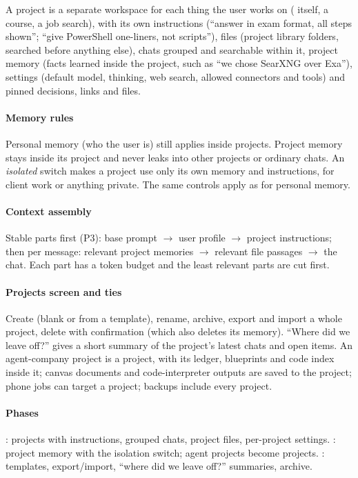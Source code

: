 A project is a separate workspace for each thing the user works on (\hivi{} itself, a course, a job search), with its own instructions (``answer in exam format, all steps shown''; ``give PowerShell one-liners, not scripts''), files (project library folders, searched before anything else), chats grouped and searchable within it, project memory (facts learned inside the project, such as ``we chose SearXNG over Exa''), settings (default model, thinking, web search, allowed connectors and tools) and pinned decisions, links and files.

\paragraph{Memory rules} Personal memory (who the user is) still applies inside projects. Project memory stays inside its project and never leaks into other projects or ordinary chats. An \emph{isolated} switch makes a project use only its own memory and instructions, for client work or anything private. The same controls apply as for personal memory.

\paragraph{Context assembly} Stable parts first (P3): base prompt $\rightarrow$ user profile $\rightarrow$ project instructions; then per message: relevant project memories $\rightarrow$ relevant file passages $\rightarrow$ the chat. Each part has a token budget and the least relevant parts are cut first.

\paragraph{Projects screen and ties} Create (blank or from a template), rename, archive, export and import a whole project, delete with confirmation (which also deletes its memory). ``Where did we leave off?'' gives a short summary of the project's latest chats and open items. An agent-company project is a \hivi{} project, with its ledger, blueprints and code index inside it; canvas documents and code-interpreter outputs are saved to the project; phone jobs can target a project; backups include every project.

\paragraph{Phases} : projects with instructions, grouped chats, project files, per-project settings. : project memory with the isolation switch; agent projects become \hivi{} projects. : templates, export/import, ``where did we leave off?'' summaries, archive.
